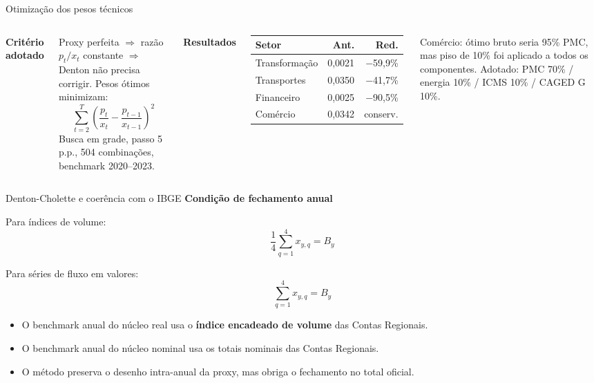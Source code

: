 \documentclass[aspectratio=169,11pt]{beamer}
\begin{document}
\begin{frame}{Otimização dos pesos técnicos}
\begin{columns}[T]
\textbf{Critério adotado}

\vspace{0.1cm}
\small
Proxy perfeita $\Rightarrow$ razão $p_t/x_t$ constante $\Rightarrow$ Denton não precisa corrigir. Pesos ótimos minimizam:
\[
\sum_{t=2}^{T} \!\left(\frac{p_t}{x_t} - \frac{p_{t-1}}{x_{t-1}}\right)^{\!2}
\]
Busca em grade, passo 5 p.p., 504 combinações, benchmark 2020--2023.

\textbf{Resultados}

\vspace{0.1cm}
\small
\begin{tabular}{p{1.9cm}rr}
\toprule
\textbf{Setor} & \textbf{Ant.} & \textbf{Red.} \\
\midrule
Transformação & 0,0021 & $-$59,9\% \\
Transportes & 0,0350 & $-$41,7\% \\
Financeiro & 0,0025 & $-$90,5\% \\
Comércio & 0,0342 & conserv. \\
\bottomrule
\end{tabular}

\vspace{0.15cm}
\scriptsize Comércio: ótimo bruto seria 95\% PMC, mas piso de 10\% foi aplicado a todos os componentes. Adotado: PMC 70\% / energia 10\% / ICMS 10\% / CAGED G 10\%.
\end{columns}
\end{frame}

\begin{frame}{Denton-Cholette e coerência com o IBGE}
\textbf{Condição de fechamento anual}

Para índices de volume:
\[
\frac{1}{4}\sum_{q=1}^{4} x_{y,q} = B_y
\]

Para séries de fluxo em valores:
\[
\sum_{q=1}^{4} x_{y,q} = B_y
\]

\vspace{0.2cm}
\begin{itemize}
  \item O benchmark anual do núcleo real usa o \textbf{índice encadeado de volume} das Contas Regionais.
  \item O benchmark anual do núcleo nominal usa os totais nominais das Contas Regionais.
  \item O método preserva o desenho intra-anual da proxy, mas obriga o fechamento no total oficial.
\end{itemize}
\end{frame}
\end{document}
